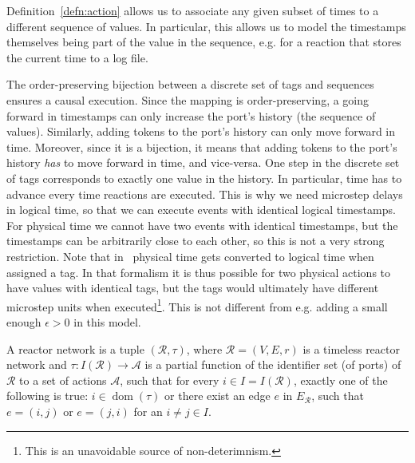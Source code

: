 
Definition~\ref{defn:action} allows us to associate any given subset of times to a different sequence of values.
In particular, this allows us to model the timestamps themselves being part of the value in the sequence, e.g. for a reaction that stores the current time to a log file.

The order-preserving bijection between a discrete set of tags and sequences ensures a causal execution.
Since the mapping is order-preserving, a going forward in timestamps can only increase the port's history (the sequence of values).
Similarly, adding tokens to the port's history can only move forward in time. 
Moreover, since it is a bijection, it means that adding tokens to the port's history \emph{has} to move forward in time, and vice-versa.
One step in the discrete set of tags corresponds to exactly one value in the history.
In particular, time has to advance every time reactions are executed. 
This is why we need microstep delays in logical time, so that we can execute events with identical logical timestamps.
For physical time we cannot have two events with identical timestamps, but the timestamps can be arbitrarily close to each other, so this is not a very strong restriction.
Note that in~\cite{lohstroh_phdthesis} physical time gets converted to logical time when assigned a tag. 
In that formalism it is thus possible for two physical actions to have values with identical tags, but the tags would ultimately have different microstep units when executed\footnote{This is an unavoidable source of non-deterimnism.}.
This is not different from e.g. adding a small enough $\epsilon > 0$ in this model.

\begin{defn}
    \label{defn:reactor_network}
    A reactor network is a tuple $(\mathcal{R},\tau)$, where $\mathcal{R} = (V,E,r)$ is a timeless reactor network and $\tau : I(\mathcal{R}) \rightarrow \mathcal{A}$ is a partial function of the identifier set (of ports) of $\mathcal{R}$ to a set of actions $\mathcal{A}$, such that 
    for every $i \in I = I(\mathcal{R})$, exactly one of the following is true: $i \in \operatorname{dom}(\tau)$ or there exist an edge $e$ in $E_{\mathcal{R}}$, such that $e = (i,j)$ or $e = (j,i)$ for an $i \neq j \in I$.
\end{defn}

